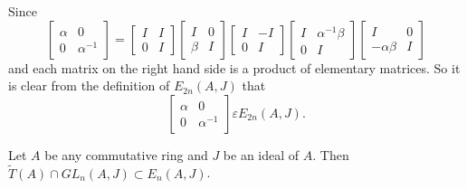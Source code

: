 \begin{Proof}
Since 
$$
\begin{bmatrix}
\alpha & 0\\
0 & \alpha^{-1}
\end{bmatrix}= \begin{bmatrix}
I & I\\
0 & I
\end{bmatrix} \begin{bmatrix}
I & 0\\
\beta & I
\end{bmatrix} \begin{bmatrix}
I & -I\\
0 & I
\end{bmatrix} \begin{bmatrix}
I & \alpha^{-1}\beta\\
0 & I
\end{bmatrix} \begin{bmatrix}
I & 0\\
-\alpha\beta & I
\end{bmatrix}
$$
and each matrix on the right hand side is a product of elementary
matrices. So it is clear from the definition of $E_{2n}(A,J)$ that 
$$
\begin{bmatrix}
\alpha & 0\\
0 & \alpha^{-1}
\end{bmatrix} \varepsilon E_{2n}(A,J).
$$
\enprf
\end{Proof}


\begin{lem}\label{c3:lem3.5}
Let $A$ be any commutative ring and $J$ be an ideal of $A$. Then
$\tilde{T}(A)\cap GL_n(A,J)\subset E_n(A,J)$.
\end{lem}


